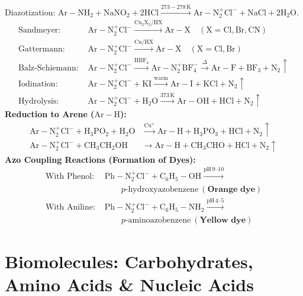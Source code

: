 \documentclass[10pt,twoside,openright]{book}
\begin{document}
\begin{formulabox}
Diazotization: $\mathrm{Ar-NH_2} + \mathrm{NaNO_2} + 2\mathrm{HCl} \xrightarrow{273-278\,\mathrm{K}} \mathrm{Ar-N_2^+Cl^-} + \mathrm{NaCl} + 2\mathrm{H_2O}$.
\begin{align*}
  \text{Sandmeyer: } & \mathrm{Ar-N_2^+Cl^-} \xrightarrow{\mathrm{Cu_2X_2 / HX}} \mathrm{Ar-X} \quad (\mathrm{X=Cl, Br, CN})\\
  \text{Gattermann: } & \mathrm{Ar-N_2^+Cl^-} \xrightarrow{\mathrm{Cu / HX}} \mathrm{Ar-X} \quad (\mathrm{X=Cl, Br})\\
  \text{Balz-Schiemann: } & \mathrm{Ar-N_2^+Cl^-} \xrightarrow{\mathrm{HBF_4}} \mathrm{Ar-N_2^+BF_4^-} \xrightarrow{\Delta} \mathrm{Ar-F} + \mathrm{BF_3} + \mathrm{N}_2 \uparrow\\
  \text{Iodination: } & \mathrm{Ar-N_2^+Cl^-} + \mathrm{KI} \xrightarrow{\text{warm}} \mathrm{Ar-I} + \mathrm{KCl} + \mathrm{N}_2 \uparrow\\
  \text{Hydrolysis: } & \mathrm{Ar-N_2^+Cl^-} + \mathrm{H_2O} \xrightarrow{373\,\mathrm{K}} \mathrm{Ar-OH} + \mathrm{HCl} + \mathrm{N}_2 \uparrow
\end{align*}
\textbf{Reduction to Arene ($\mathrm{Ar-H}$):}
\begin{align*}
  \mathrm{Ar-N_2^+Cl^-} + \mathrm{H_3PO_2 + H_2O} &\xrightarrow{\mathrm{Cu}^+} \mathrm{Ar-H} + \mathrm{H_3PO_3} + \mathrm{HCl} + \mathrm{N}_2 \uparrow\\
  \mathrm{Ar-N_2^+Cl^-} + \mathrm{CH_3CH_2OH} &\longrightarrow \mathrm{Ar-H} + \mathrm{CH_3CHO} + \mathrm{HCl} + \mathrm{N}_2 \uparrow
\end{align*}
\textbf{Azo Coupling Reactions (Formation of Dyes):}
\begin{align*}
  \text{With Phenol: } & \mathrm{Ph-N_2^+Cl^-} + \mathrm{C_6H_5-OH} \xrightarrow{\mathrm{pH}\, 9\text{--}10}\\
  &\qquad p\text{-hydroxyazobenzene} \ (\textbf{Orange dye})\\
  \text{With Aniline: } & \mathrm{Ph-N_2^+Cl^-} + \mathrm{C_6H_5-NH_2} \xrightarrow{\mathrm{pH}\, 4\text{--}5}\\
  &\qquad p\text{-aminoazobenzene} \ (\textbf{Yellow dye})
\end{align*}
\end{formulabox}

\section{Biomolecules: Carbohydrates, Amino Acids \& Nucleic Acids}
\end{document}
